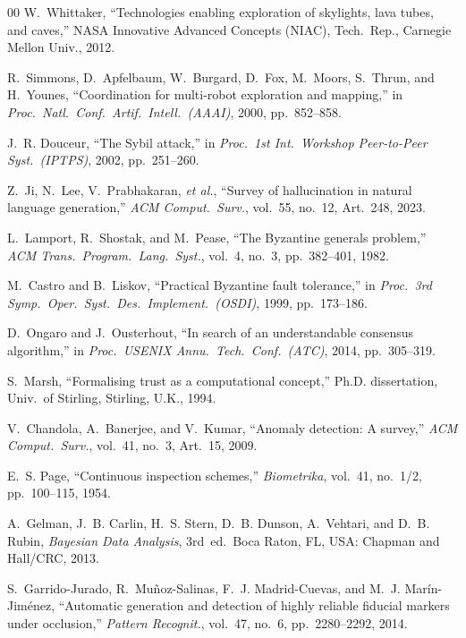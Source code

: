 \documentclass[conference]{IEEEtran}
\begin{document}
\begin{thebibliography}{00}
W.~Whittaker, ``Technologies enabling exploration of skylights, lava
tubes, and caves,''
NASA Innovative Advanced Concepts (NIAC), Tech.\ Rep.,
Carnegie Mellon Univ., 2012.

R.~Simmons, D.~Apfelbaum, W.~Burgard, D.~Fox, M.~Moors, S.~Thrun,
and H.~Younes,
``Coordination for multi-robot exploration and mapping,''
in \emph{Proc.\ Natl.\ Conf.\ Artif.\ Intell.\ (AAAI)}, 2000,
pp.~852--858.

J.~R. Douceur, ``The Sybil attack,''
in \emph{Proc.\ 1st Int.\ Workshop Peer-to-Peer Syst.\ (IPTPS)}, 2002,
pp.~251--260.

Z.~Ji, N.~Lee, V.~Prabhakaran, \emph{et al.},
``Survey of hallucination in natural language generation,''
\emph{ACM Comput.\ Surv.}, vol.~55, no.~12, Art.~248, 2023.

L.~Lamport, R.~Shostak, and M.~Pease,
``The Byzantine generals problem,''
\emph{ACM Trans.\ Program.\ Lang.\ Syst.}, vol.~4, no.~3,
pp.~382--401, 1982.

M.~Castro and B.~Liskov,
``Practical Byzantine fault tolerance,''
in \emph{Proc.\ 3rd Symp.\ Oper.\ Syst.\ Des.\ Implement.\ (OSDI)},
1999, pp.~173--186.

D.~Ongaro and J.~Ousterhout,
``In search of an understandable consensus algorithm,''
in \emph{Proc.\ USENIX Annu.\ Tech.\ Conf.\ (ATC)}, 2014,
pp.~305--319.

S.~Marsh, ``Formalising trust as a computational concept,''
Ph.D. dissertation, Univ.\ of Stirling, Stirling, U.K., 1994.

V.~Chandola, A.~Banerjee, and V.~Kumar,
``Anomaly detection: A survey,''
\emph{ACM Comput.\ Surv.}, vol.~41, no.~3, Art.~15, 2009.

E.~S. Page, ``Continuous inspection schemes,''
\emph{Biometrika}, vol.~41, no.~1/2, pp.~100--115, 1954.

A.~Gelman, J.~B. Carlin, H.~S. Stern, D.~B. Dunson, A.~Vehtari,
and D.~B. Rubin, \emph{Bayesian Data Analysis}, 3rd~ed.\
Boca Raton, FL, USA: Chapman and Hall/CRC, 2013.

S.~Garrido-Jurado, R.~Mu\~{n}oz-Salinas, F.~J. Madrid-Cuevas, and
M.~J. Mar\'{i}n-Jim\'{e}nez,
``Automatic generation and detection of highly reliable fiducial markers
under occlusion,''
\emph{Pattern Recognit.}, vol.~47, no.~6, pp.~2280--2292, 2014.


\end{thebibliography}
\end{document}
